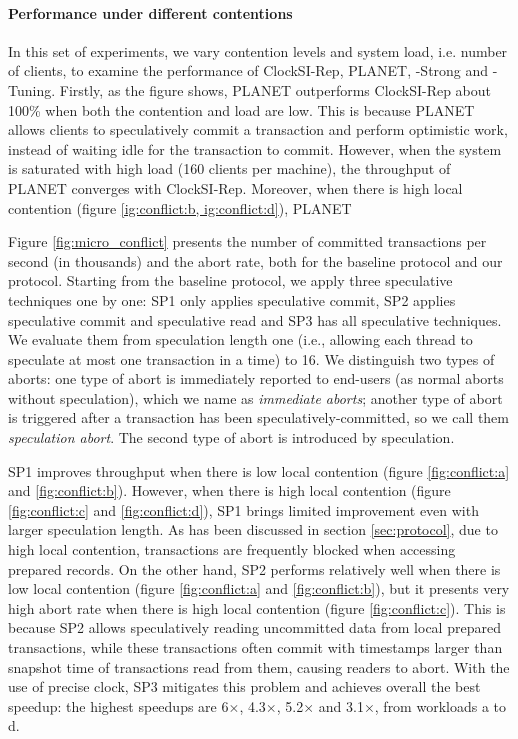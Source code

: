 \paragraph{Performance under different contentions} In this set of experiments, we vary contention levels and system load, i.e. number of clients, to examine the performance of ClockSI-Rep, PLANET, {\specula}-Strong and {\specula}-Tuning. Firstly, as the figure shows, PLANET outperforms ClockSI-Rep about 100\% when both the contention and load are low. This is because PLANET allows clients to speculatively commit a transaction and perform optimistic work, instead of waiting idle for the transaction to commit. However, when the system is saturated with high load (160 clients per machine), the throughput of PLANET converges with ClockSI-Rep. Moreover, when there is high local contention (figure \ref{ig:conflict:b, ig:conflict:d}), PLANET 

Figure \ref{fig:micro_conflict} presents the number of committed transactions per second (in thousands) and the abort rate, both for the baseline protocol and our protocol. Starting from the baseline protocol, we apply three speculative techniques one by one: SP1 only applies speculative commit, SP2 applies speculative commit and speculative read and SP3 has all speculative techniques. We evaluate them from speculation length one (i.e., allowing each thread to speculate at most one transaction in a time) to 16. We distinguish two types of aborts: one type of abort is immediately reported to end-users (as normal aborts without speculation), which we name as \textit{immediate aborts}; another type of abort is triggered after a transaction has been speculatively-committed, so we call them \textit{speculation abort}. The second type of abort is introduced by speculation.

SP1 improves throughput when there is low local contention (figure \ref{fig:conflict:a} and \ref{fig:conflict:b}). However, when there is high local contention (figure \ref{fig:conflict:c} and \ref{fig:conflict:d}), SP1 brings limited improvement even with larger speculation length. As has been discussed in section \ref{sec:protocol}, due to high local contention, transactions are frequently blocked when accessing prepared records. On the other hand, SP2 performs relatively well when there is low local contention (figure \ref{fig:conflict:a} and \ref{fig:conflict:b}), but it presents very high abort rate when there is high local contention (figure \ref{fig:conflict:c}). This is because SP2 allows speculatively reading uncommitted data from local prepared transactions, while these transactions often commit with timestamps larger than snapshot time of transactions read from them, causing readers to abort. With the use of precise clock, SP3 mitigates this problem and achieves overall the best speedup: the highest speedups are 6$\times$, 4.3$\times$, 5.2$\times$ and 3.1$\times$, from workloads a to d. 

